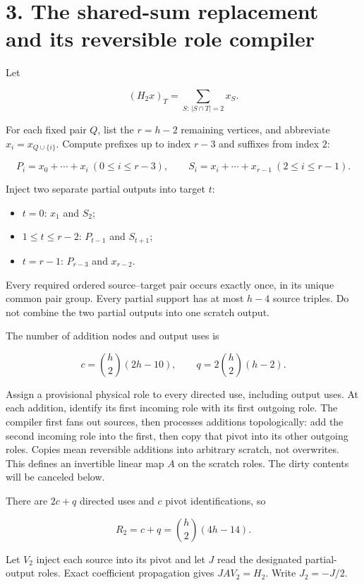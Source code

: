 \documentclass[
  11pt,
  letterpaper,
]{article}
\providecommand{\tightlist}{%
  \setlength{\itemsep}{0pt}\setlength{\parskip}{0pt}}
\begin{document}
\section{3. The shared-sum replacement and its reversible role
compiler}\label{the-shared-sum-replacement-and-its-reversible-role-compiler}

Let

\[
(H_2x)_T=\sum_{S:\,|S\cap T|=2}x_S.
\]

For each fixed pair \(Q\), list the \(r=h-2\) remaining vertices, and
abbreviate \(x_i=x_{Q\cup\{i\}}\). Compute prefixes up to index \(r-3\)
and suffixes from index \(2\):

\[
P_i=x_0+\cdots+x_i\ (0\le i\le r-3),
\qquad S_i=x_i+\cdots+x_{r-1}\ (2\le i\le r-1).
\]

Inject two separate partial outputs into target \(t\):

\begin{itemize}
\tightlist
\item
  \(t=0\): \(x_1\) and \(S_2\);
\item
  \(1\le t\le r-2\): \(P_{t-1}\) and \(S_{t+1}\);
\item
  \(t=r-1\): \(P_{r-3}\) and \(x_{r-2}\).
\end{itemize}

Every required ordered source--target pair occurs exactly once, in its
unique common pair group. Every partial support has at most \(h-4\)
source triples. Do not combine the two partial outputs into one scratch
output.

The number of addition nodes and output uses is

\[
c=\binom h2(2h-10),\qquad q=2\binom h2(h-2).
\]

Assign a provisional physical role to every directed use, including
output uses. At each addition, identify its first incoming role with its
first outgoing role. The compiler first fans out sources, then processes
additions topologically: add the second incoming role into the first,
then copy that pivot into its other outgoing roles. Copies mean
reversible additions into arbitrary scratch, not overwrites. This
defines an invertible linear map \(A\) on the scratch roles. The dirty
contents will be canceled below.

There are \(2c+q\) directed uses and \(c\) pivot identifications, so

\[
\boxed{R_2=c+q=\binom h2(4h-14).}
\]

Let \(V_2\) inject each source into its pivot and let \(J\) read the
designated partial-output roles. Exact coefficient propagation gives
\(JAV_2=H_2\). Write \(J_2=-J/2\).
\end{document}
